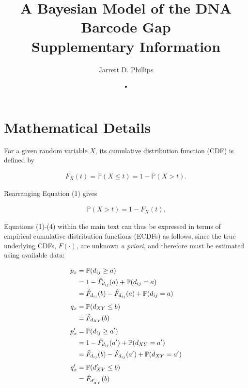 \documentclass[12pt]{article}
\begin{document}
\title{A Bayesian Model of the DNA Barcode Gap \\ \vspace{5mm} Supplementary Information}

\author{Jarrett D. Phillips}

\date{•}

\maketitle

\section{Mathematical Details}

For a given random variable $X$, its cumulative distribution function (CDF) is defined by

\begin{align}
F_X(t) = \mathbb{P}(X \leq t) = 1 - \mathbb{P}(X > t). 
\end{align}

\noindent Rearranging Equation (1) gives

\begin{align}
\mathbb{P}(X > t) = 1 - F_X(t).
\end{align}

Equations (1)-(4) within the main text can thus be expressed in terms of empirical cumulative distribution functions (ECDFs) as follows, since the true underlying CDFs, $F(\cdot)$, are unknown \textit{a priori}, and therefore must be estimated using available data:

\begin{align}
p_x  &= \mathbb{P}(d_{ij} \geq a) \notag \\
     &= 1 - \hat{F}_{d_{ij}}(a) + \mathbb{P}(d_{ij} = a) \notag \\
     &= \hat{F}_{d_{ij}}(b) - \hat{F}_{d_{ij}}(a) +  \mathbb{P}(d_{ij} = a) \\[1ex]
q_x  &=  \mathbb{P}(d_{XY} \leq b) \notag \\
     &= \hat{F}_{d_{XY}}(b) \\[1ex]
p'_x &=  \mathbb{P}(d_{ij} \geq a') \notag \\
     &= 1 - \hat{F}_{d_{ij}}(a') +  \mathbb{P}(d_{XY} = a') \notag \\
     &= \hat{F}_{d_{ij}}(b) - \hat{F}_{d_{ij}}(a') +  \mathbb{P}(d_{XY} = a')  \\[1ex]
q'_x &=  \mathbb{P}(d'_{XY} \leq b) \notag \\
     &= \hat{F}_{d'_{XY}}(b)
\end{align}
\end{document}
